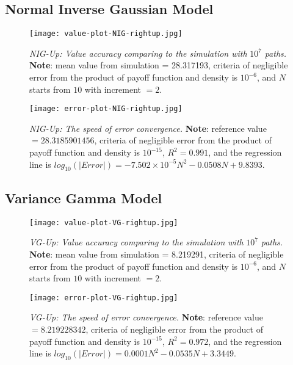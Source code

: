 \subsection{Normal Inverse Gaussian Model}
\begin{figure}[H]
    \centering
    \texttt{[image: value-plot-NIG-rightup.jpg]}
    \caption[\emph{NIG-Up: Value accuracy comparing to the simulation with} $10^7$ \emph{paths.}]{\emph{NIG-Up: Value accuracy comparing to the simulation with} $10^7$ \emph{paths.} \textbf{Note}: mean value from simulation = 28.317193, criteria of negligible error from the product of payoff function and density is $10^{-6}$, and $N$ starts from $10$  with increment $=2$.}
 
    \label{fig:label}
\end{figure}

\begin{figure}[H]
    \centering
    \texttt{[image: error-plot-NIG-rightup.jpg]}
    \caption[\emph{NIG-Up: The speed of error convergence.}]{\emph{NIG-Up: The speed of error convergence.} \textbf{Note}: reference value $=28.3185901456$, criteria of negligible error from the product of payoff function and density is $10^{-15}$, $R^2=0.991$, and the regression line is $log_{10}\left(|Error|\right) = -7.502\times 10^{-5}N^2-0.0508N+9.8393$.}

    \label{fig:label}
\end{figure}


\subsection{Variance Gamma Model}
\begin{figure}[H]
    \centering
    \texttt{[image: value-plot-VG-rightup.jpg]}
    \caption[\emph{VG-Up: Value accuracy comparing to the simulation with} $10^7$ \emph{paths.}]{\emph{VG-Up: Value accuracy comparing to the simulation with} $10^7$ \emph{paths.} \textbf{Note}: mean value from simulation = 8.219291, criteria of negligible error from the product of payoff function and density is $10^{-6}$, and $N$ starts from $10$  with increment $=2$.}

    \label{fig:label}
\end{figure}

\begin{figure}[H]
    \centering
    \texttt{[image: error-plot-VG-rightup.jpg]}
    \caption[\emph{VG-Up: The speed of error convergence.}]{\emph{VG-Up: The speed of error convergence.} \textbf{Note}: reference value $=8.219228342$, criteria of negligible error from the product of payoff function and density is $10^{-15}$, $R^2=0.972$, and the regression line is $log_{10}\left(|Error|\right) = 0.0001N^2-0.0535N+3.3449$.}

    \label{fig:label}
\end{figure}

